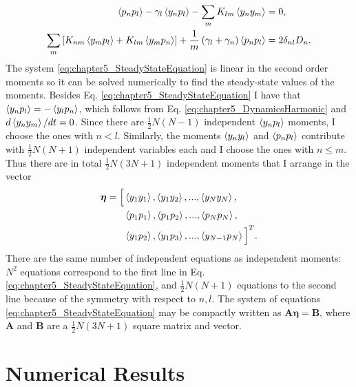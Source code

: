 %
\begin{equation}
    \begin{split}
        \expval{p_n p_l} - \gamma_l\expval{y_n p_l} - \sum_m K_{lm}\expval{y_n y_m} &= 0,\\
        \sum_{m}\left[ K_{nm}\expval{y_m p_l} + K_{lm}\expval{y_m p_n} \right] + \frac{1}{m}\left( \gamma_l + \gamma_n \right)\expval{p_n p_l} &= 2 \delta_{nl} D_n.
    \end{split}
    \label{eq:chapter5_SteadyStateEquation}
\end{equation}
%
The system \eqref{eq:chapter5_SteadyStateEquation} is linear in the second order moments so it can be solved numerically to find the steady-state values of the moments. Besides Eq. \eqref{eq:chapter5_SteadyStateEquation} I have that $\expval{y_n p_l} = - \expval{y_l p_n}$, which follows from Eq. \eqref{eq:chapter5_DynamicsHarmonic} and $d\expval{y_n y_m}/dt = 0$. Since there are $\frac{1}{2}N(N-1)$ independent $\expval{y_n p_l}$ moments, I choose the ones with $n<l$. Similarly, the moments $\expval{y_n y_l}$ and $\expval{p_n p_l}$ contribute with $\frac{1}{2}N(N+1)$ independent variables each and I choose the ones with $n\leq m$. Thus there are in total $\frac{1}{2}N(3N+1)$ independent moments that I arrange in the vector
%
\begin{equation}
\begin{split}
    \bm\eta = \Big[ &\expval{y_1 y_1},\expval{y_1 y_2},...,\expval{y_N y_N},\\
    &\expval{p_1 p_1},\expval{p_1 p_2},...,\expval{p_N p_N},\\
    &\expval{y_1 p_2},\expval{y_1 p_3},...,\expval{y_{N-1} p_N}\Big]^T.
    \label{eq:chapter5_CovariancesVector}
\end{split}
\end{equation}
%
There are the same number of independent equations
as independent moments: $N^2$
equations correspond to the first line in Eq.  \eqref{eq:chapter5_SteadyStateEquation}, and $\frac{1}{2}N(N+1)$ equations
to the second line because of the symmetry with respect to $n,l$. The system of equations \eqref{eq:chapter5_SteadyStateEquation} may be compactly written as $\mathbf{A}\boldsymbol\eta = \mathbf{B}$, where $\mathbf{A}$ and $\mathbf{B}$ are a $\frac{1}{2}N(3N+1)$ square matrix and vector.

\section{Numerical Results\label{sec:chapter5_NumericalResults}}



